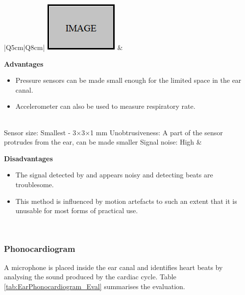 \begin{table}[H]
\caption{Ear BCG}
\label{tab:EarBCG_Eval}
\renewcommand{\arraystretch}{1.3}	%
\centering
\begin{tabular}{|Q{5cm}|Q{8cm}|} 
 \hline
\includegraphics[scale=1]{figs/Image.png}		& 

	\textbf{Advantages}
	\begin{itemize}[leftmargin=1em, noitemsep, topsep=2pt]	  
	\item Pressure sensors can be made small enough for the limited space in the ear canal.
	\item Accelerometer can also be used to measure respiratory rate.
	\end{itemize}\\

\hline
Sensor size: Smallest - 3$\times$3$\times$1 mm	\citep{Accelerometer}		\newline								
Unobtrusiveness: A part of the sensor protrudes from the ear, can be made smaller 	\newline	
Signal noise: High \citep{da2010ear, winokur2012wearable} 							&	
 
	\textbf{Disadvantages}
	\begin{itemize}[leftmargin=1em, noitemsep, topsep=2pt]	
	\item The signal detected by \cite{da2010ear} and \cite{winokur2012wearable} appears noisy and detecting beats are troublesome.
	\item This method is influenced by motion artefacts to such an extent that it is unusable for most forms of practical use.
 	\end{itemize}\\
 
\hline
\end{tabular}
\end{table}

\subsubsection{Phonocardiogram}
A microphone is placed inside the ear canal and identifies heart beats by analysing the sound produced by the cardiac cycle. Table \ref{tab:EarPhonocardiogram_Eval} summarises the evaluation.

